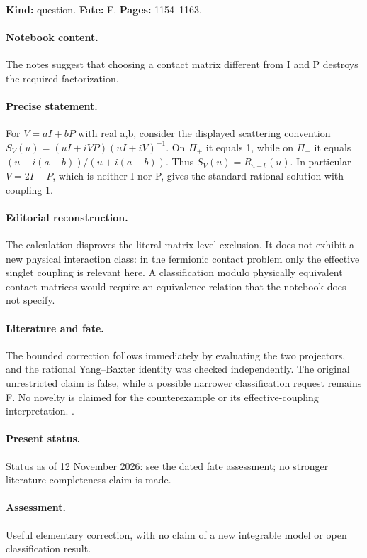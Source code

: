 \noindent\textbf{Kind:} question. \textbf{Fate:} F. \textbf{Pages:} 1154--1163.\par

\paragraph{Notebook content.} The notes suggest that choosing a contact matrix different from I and P destroys the required factorization.

\paragraph{Precise statement.} For $V=aI+bP$ with real a,b, consider the displayed scattering convention $S_V(u)=(uI+iVP)(uI+iV)^{-1}$. On $\Pi_+$ it equals 1, while on $\Pi_-$ it equals $(u-i(a-b))/(u+i(a-b))$. Thus $S_V(u)=R_{a-b}(u)$. In particular $V=2I+P$, which is neither I nor P, gives the standard rational solution with coupling 1.

\paragraph{Editorial reconstruction.} The calculation disproves the literal matrix-level exclusion. It does not exhibit a new physical interaction class: in the fermionic contact problem only the effective singlet coupling is relevant here. A classification modulo physically equivalent contact matrices would require an equivalence relation that the notebook does not specify.

\paragraph{Literature and fate.} The bounded correction follows immediately by evaluating the two projectors, and the rational Yang--Baxter identity was checked independently. The original unrestricted claim is false, while a possible narrower classification request remains F. No novelty is claimed for the counterexample or its effective-coupling interpretation. \citep{yang1967manybody}.

\paragraph{Present status.} Status as of 12 November 2026: see the dated fate assessment; no stronger literature-completeness claim is made.

\paragraph{Assessment.} Useful elementary correction, with no claim of a new integrable model or open classification result.

